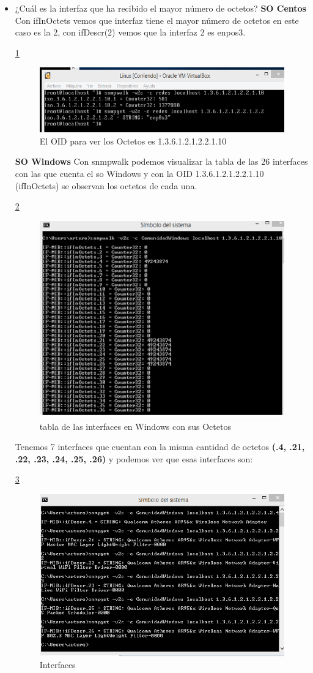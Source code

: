 \documentclass[10pt,a4paper]{book}
\author{Rosa}
\begin{document}
\begin{itemize}

\item ¿Cuál es la interfaz que ha recibido el mayor número de octetos?
\textbf{SO Centos}
Con ifInOctets vemos que interfaz tiene el mayor número de octetos en este caso es la 2, con ifDescr(2) vemos que la interfaz  2 es enpos3.
 
\ref{image:Pregunta4O}
\FloatBarrier
\begin{figure}[htbp!]
		\centering
		    \includegraphics[width=.5 \textwidth]{../images/Pregunta4O.png} 
		\caption{El OID para ver los Octetos es 1.3.6.1.2.1.2.2.1.10}
		\label{image:Pregunta4O}
\end{figure}
\FloatBarrier

\textbf{SO Windows}
Con snmpwalk  podemos visualizar la tabla de las 26 interfaces con las que cuenta el so Windows y con la OID 1.3.6.1.2.1.2.2.1.10 (ifInOctets) se observan los octetos de cada una.

\ref{image:Pregunta4W}
\FloatBarrier
\begin{figure}[htbp!]
		\centering
		    \includegraphics[width=.5 \textwidth]{../images/Pregunta4W.png} 
		\caption{tabla de las interfaces en Windows con sus Octetos}
		\label{image:Pregunta4W}
\end{figure}
\FloatBarrier

 Tenemos 7 interfaces que cuentan con la misma cantidad de octetos \textbf{(.4, .21, .22, .23, .24, .25, .26)} y podemos ver que esas interfaces son:
 
\ref{image:Pregunta4W2}
\FloatBarrier
\begin{figure}[htbp!]
		\centering
		    \includegraphics[width=.5 \textwidth]{../images/Pregunta4W2.png} 
		\caption{Interfaces}
		\label{image:Pregunta4W2}
\end{figure}
\FloatBarrier


\end{itemize}
\end{document}
